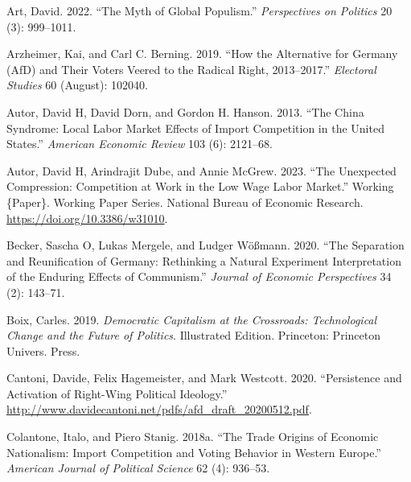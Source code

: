 \documentclass[
]{article}
\newlength{\cslhangindent}
\newlength{\cslentryspacingunit} %
\newenvironment{CSLReferences}[2] %
 {%
  \setlength{\parindent}{0pt}
  \ifodd #1
  \let\oldpar\par
  \def\par{\hangindent=\cslhangindent\oldpar}
  \fi
  \setlength{\parskip}{#2\cslentryspacingunit}
 }%
 {}
\begin{document}
\hypertarget{refs}{}
\begin{CSLReferences}{1}{0}
\leavevmode{}%
Art, David. 2022. {``The {Myth} of {Global} {Populism}.''}
\emph{Perspectives on Politics} 20 (3): 999--1011.

\leavevmode{}%
Arzheimer, Kai, and Carl C. Berning. 2019. {``How the {Alternative} for
{Germany} ({AfD}) and Their Voters Veered to the Radical Right,
2013--2017.''} \emph{Electoral Studies} 60 (August): 102040.

\leavevmode{}%
Autor, David H, David Dorn, and Gordon H. Hanson. 2013. {``The {China}
{Syndrome}: {Local} {Labor} {Market} {Effects} of {Import} {Competition}
in the {United} {States}.''} \emph{American Economic Review} 103 (6):
2121--68.

\leavevmode{}%
Autor, David H, Arindrajit Dube, and Annie McGrew. 2023. {``The
{Unexpected} {Compression}: {Competition} at {Work} in the {Low} {Wage}
{Labor} {Market}.''} Working \{Paper\}. Working {Paper} {Series}.
National Bureau of Economic Research.
\url{https://doi.org/10.3386/w31010}.

\leavevmode{}%
Becker, Sascha O, Lukas Mergele, and Ludger Wößmann. 2020. {``The
Separation and Reunification of Germany: Rethinking a Natural Experiment
Interpretation of the Enduring Effects of Communism.''} \emph{Journal of
Economic Perspectives} 34 (2): 143--71.

\leavevmode{}%
Boix, Carles. 2019. \emph{Democratic {Capitalism} at the {Crossroads}:
{Technological} {Change} and the {Future} of {Politics}}. Illustrated
Edition. Princeton: Princeton Univers. Press.

\leavevmode{}%
Cantoni, Davide, Felix Hagemeister, and Mark Westcott. 2020.
{``Persistence and {Activation} of {Right}-{Wing} {Political}
{Ideology}.''}
\url{http://www.davidecantoni.net/pdfs/afd_draft_20200512.pdf}.

\leavevmode{}%
Colantone, Italo, and Piero Stanig. 2018a. {``The {Trade} {Origins} of
{Economic} {Nationalism}: {Import} {Competition} and {Voting} {Behavior}
in {Western} {Europe}.''} \emph{American Journal of Political Science}
62 (4): 936--53.


\end{CSLReferences}
\end{document}
